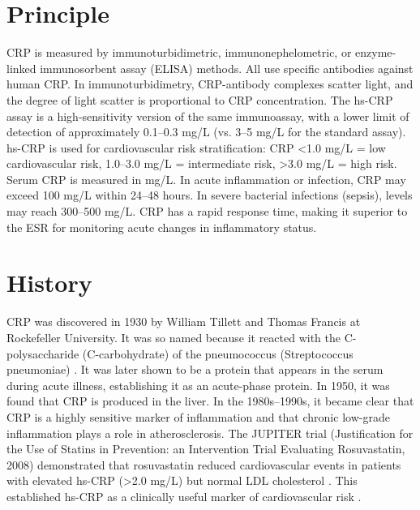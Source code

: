 \section*{Principle}
CRP is measured by immunoturbidimetric, immunonephelometric, or enzyme-linked immunosorbent assay (ELISA) methods. All use specific antibodies against human CRP. In immunoturbidimetry, CRP-antibody complexes scatter light, and the degree of light scatter is proportional to CRP concentration. The hs-CRP assay is a high-sensitivity version of the same immunoassay, with a lower limit of detection of approximately 0.1--0.3 mg/L (vs. 3--5 mg/L for the standard assay). hs-CRP is used for cardiovascular risk stratification: CRP <1.0 mg/L = low cardiovascular risk, 1.0--3.0 mg/L = intermediate risk, >3.0 mg/L = high risk. Serum CRP is measured in mg/L. In acute inflammation or infection, CRP may exceed 100 mg/L within 24--48 hours. In severe bacterial infections (sepsis), levels may reach 300--500 mg/L. CRP has a rapid response time, making it superior to the ESR for monitoring acute changes in inflammatory status.

\section*{History}
CRP was discovered in 1930 by William Tillett and Thomas Francis at Rockefeller University. It was so named because it reacted with the C-polysaccharide (C-carbohydrate) of the pneumococcus (Streptococcus pneumoniae) \cite{tillett1930serological}. It was later shown to be a protein that appears in the serum during acute illness, establishing it as an acute-phase protein. In 1950, it was found that CRP is produced in the liver. In the 1980s--1990s, it became clear that CRP is a highly sensitive marker of inflammation and that chronic low-grade inflammation plays a role in atherosclerosis. The JUPITER trial (Justification for the Use of Statins in Prevention: an Intervention Trial Evaluating Rosuvastatin, 2008) demonstrated that rosuvastatin reduced cardiovascular events in patients with elevated hs-CRP (>2.0 mg/L) but normal LDL cholesterol \cite{ridker2008rosuvastatin}. This established hs-CRP as a clinically useful marker of cardiovascular risk \cite{pepys2003creactive}.

